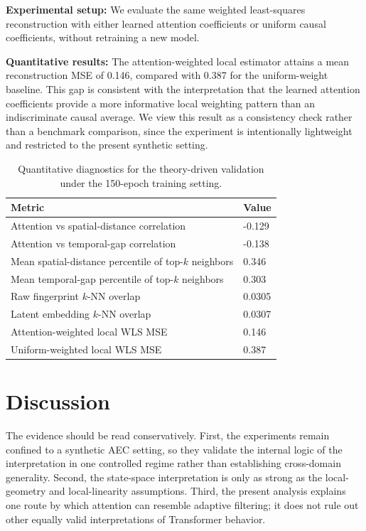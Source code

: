 \documentclass[conference]{IEEEtran}
\newcommand{\AttnSpatialCorr}{-0.129}
\newcommand{\AttnTemporalCorr}{-0.138}
\newcommand{\AttnSpatialPct}{0.346}
\newcommand{\AttnTemporalPct}{0.303}
\newcommand{\RawKnn}{0.0305}
\newcommand{\LatentKnn}{0.0307}
\newcommand{\KernelMSEAttn}{0.146}
\newcommand{\KernelMSEUniform}{0.387}
\begin{document}
\textbf{Experimental setup:} We evaluate the same weighted least-squares reconstruction with either learned attention coefficients or uniform causal coefficients, without retraining a new model.

\textbf{Quantitative results:} The attention-weighted local estimator attains a mean reconstruction MSE of \KernelMSEAttn{}, compared with \KernelMSEUniform{} for the uniform-weight baseline. This gap is consistent with the interpretation that the learned attention coefficients provide a more informative local weighting pattern than an indiscriminate causal average. We view this result as a consistency check rather than a benchmark comparison, since the experiment is intentionally lightweight and restricted to the present synthetic setting.

\begin{table}[t]
\centering
\caption{Quantitative diagnostics for the theory-driven validation under the 150-epoch training setting.}
\label{tab:metrics}
\scriptsize
\begin{tabular}{@{}ll@{}}
\toprule
\textbf{Metric} & \textbf{Value} \\ \midrule
Attention vs spatial-distance correlation & \AttnSpatialCorr \\
Attention vs temporal-gap correlation & \AttnTemporalCorr \\
Mean spatial-distance percentile of top-$k$ neighbors & \AttnSpatialPct \\
Mean temporal-gap percentile of top-$k$ neighbors & \AttnTemporalPct \\
Raw fingerprint $k$-NN overlap & \RawKnn \\
Latent embedding $k$-NN overlap & \LatentKnn \\
Attention-weighted local WLS MSE & \KernelMSEAttn \\
Uniform-weighted local WLS MSE & \KernelMSEUniform \\ \bottomrule
\end{tabular}
\end{table}

\section{Discussion}
The evidence should be read conservatively. First, the experiments remain confined to a synthetic AEC setting, so they validate the internal logic of the interpretation in one controlled regime rather than establishing cross-domain generality. Second, the state-space interpretation is only as strong as the local-geometry and local-linearity assumptions. Third, the present analysis explains one route by which attention can resemble adaptive filtering; it does not rule out other equally valid interpretations of Transformer behavior.
\end{document}

